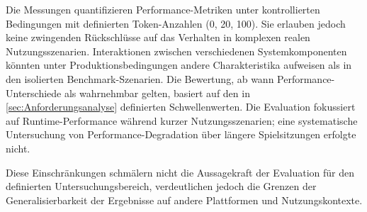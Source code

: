 Die Messungen quantifizieren Performance-Metriken unter kontrollierten Bedingungen mit definierten Token-Anzahlen (0, 20, 100). Sie erlauben jedoch keine zwingenden Rückschlüsse auf das Verhalten in komplexen realen Nutzungsszenarien. Interaktionen zwischen verschiedenen Systemkomponenten könnten unter Produktionsbedingungen andere Charakteristika aufweisen als in den isolierten Benchmark-Szenarien. Die Bewertung, ab wann Performance-Unterschiede als wahrnehmbar gelten, basiert auf den in \autoref{sec:Anforderungsanalyse} definierten Schwellenwerten. Die Evaluation fokussiert auf Runtime-Performance während kurzer Nutzungsszenarien; eine systematische Untersuchung von Performance-Degradation über längere Spielsitzungen erfolgte nicht.

Diese Einschränkungen schmälern nicht die Aussagekraft der Evaluation für den definierten Untersuchungsbereich, verdeutlichen jedoch die Grenzen der Generalisierbarkeit der Ergebnisse auf andere Plattformen und Nutzungskontexte.
